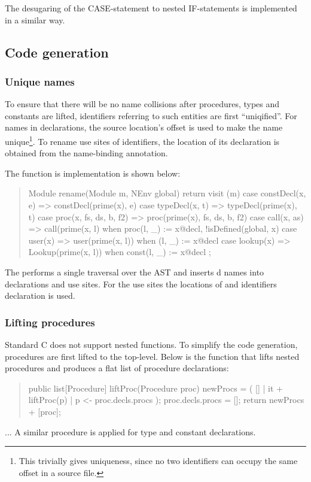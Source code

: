 The desugaring of the CASE-statement to nested IF-statements is
implemented in a similar way.


\subsection{Code generation}


\subsubsection{Unique names}

\noindent To ensure that there will be no name collisions after
procedures, types and constants are lifted, identifiers referring to
such entities are first ``uniqified''. For names in declarations, the
source location's offset is used to make the name unique\footnote{This
  trivially gives uniqueness, since no two identifiers can occupy the
  same offset in a source file.}. To rename use sites of
identifiers, the location of its declaration is obtained from the
name-binding  annotation.

The  function is implementation is shown below:
\begin{quote}
\begin{rascal}
Module rename(Module m, NEnv global) {
  return visit (m) {
    case constDecl(x, e) => constDecl(prime(x), e)
    case typeDecl(x, t) => typeDecl(prime(x), t)
    case proc(x, fs, ds, b, f2) => proc(prime(x), fs, ds, b, f2)
    case call(x, as) => call(prime(x, l)
       when proc(l, _) := x@decl, !isDefined(global, x)
    case user(x) => user(prime(x, l))
      when \type(l, _) := x@decl
    case lookup(x) => Lookup(prime(x, l))
      when const(l, _) := x@decl
  };
}
\end{rascal}
\end{quote}
The  performs a single traversal over the AST and
inserts d names into declarations and use sites. For
the use sites the locations of and identifiers declaration is used.

\subsubsection{Lifting procedures}

\noindent Standard C does not support nested functions. To simplify
the code generation, \oberon procedures are first lifted to the
top-level. Below is the function that lifts nested procedures and
produces a flat list of procedure declarations:
\begin{quote}
\begin{rascal}
public list[Procedure] liftProc(Procedure proc) {
  newProcs = ( [] | it + liftProc(p) | p <- proc.decls.procs );
  proc.decls.procs = [];
  return newProcs + [proc];
}
\end{rascal}
\end{quote}
...
A similar procedure is applied for type and constant declarations. 

